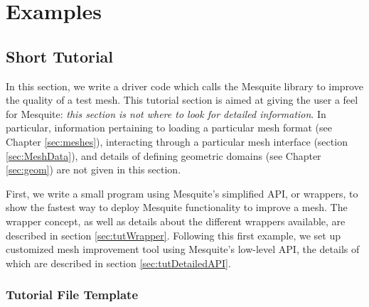 \chapter{Examples} \label{sec:examples}

\section{Short Tutorial}

In this section, we write a driver code which calls the Mesquite
library to improve the quality of a test mesh. This tutorial section
is aimed at giving the user a feel for Mesquite: \emph{this section is not
where to look for detailed information}. In particular, information
pertaining to loading a particular mesh format (see Chapter \ref{sec:meshes}),
interacting through a particular mesh interface (section \ref{sec:MeshData}),
and details of defining geometric domains (see Chapter \ref{sec:geom}) are not
given in this section.

First, we write a small program using Mesquite's simplified API, or
wrappers, to show the fastest way to deploy Mesquite functionality to
improve a mesh.  The wrapper concept, as well as details about the
different wrappers available, are described in section
\ref{sec:tutWrapper}.  Following this first example, we set up customized mesh
improvement tool using Mesquite's low-level API, the details of which
are described in section \ref{sec:tutDetailedAPI}.

\subsection{Tutorial File Template}
\label{sec:tutfile}

